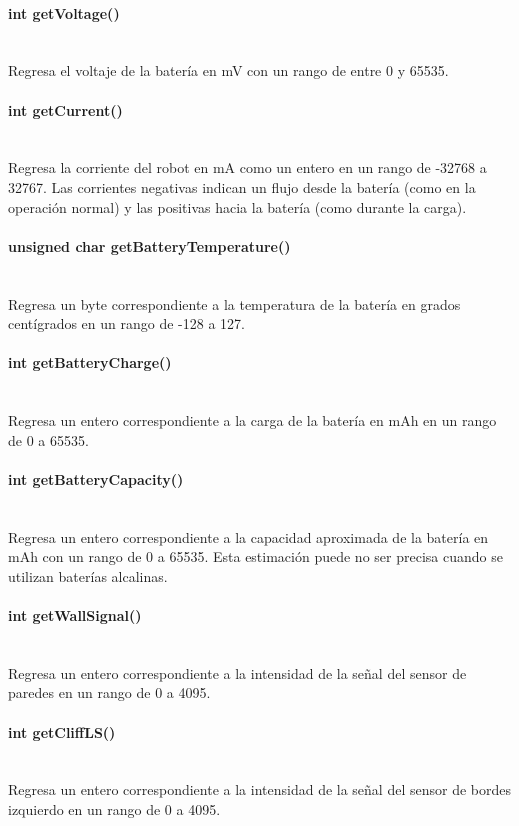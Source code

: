 \documentclass[letterpaper,openright,12pt]{book}
\begin{document}
\paragraph{int getVoltage()}\mbox{}\\
Regresa el voltaje de la batería en mV con un rango de entre 0 y 65535.\\
\paragraph{int getCurrent()}\mbox{}\\
Regresa la corriente del robot en mA como un entero en un rango de  -32768 a 32767. Las corrientes negativas indican un flujo desde la batería (como en la operación normal) y las positivas hacia la batería (como durante la carga).\\

\paragraph{unsigned char getBatteryTemperature()}\mbox{}\\
Regresa un byte correspondiente a la temperatura de la batería en grados centígrados en un rango de -128 a 127.\\
\paragraph{int getBatteryCharge()}\mbox{}\\
Regresa un entero correspondiente a la carga de la batería en mAh  en un rango de 0 a 65535.\\
\paragraph{int getBatteryCapacity()}\mbox{}\\
Regresa un entero correspondiente a la capacidad aproximada de la batería en mAh con un rango de 0 a 65535. Esta estimación puede no ser precisa cuando se utilizan baterías alcalinas.\\
\paragraph{int getWallSignal()}\mbox{}\\
Regresa un entero correspondiente a la intensidad de la señal del sensor de paredes en un rango de 0 a 4095.\\
\paragraph{int getCliffLS()}\mbox{}\\
Regresa un entero correspondiente a la intensidad de la señal del sensor de bordes izquierdo en un rango de 0 a 4095.\\
\end{document}
